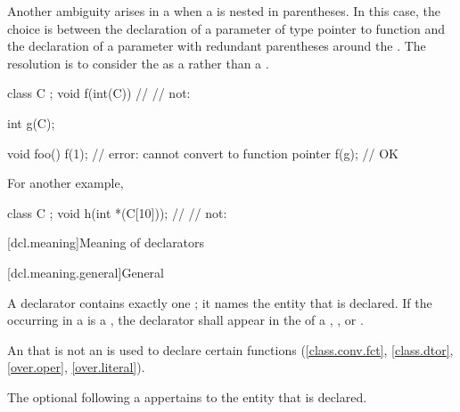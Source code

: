 \pnum
Another ambiguity arises in a
 when a
is nested in parentheses.
In this case, the choice is between the declaration of a parameter of type
pointer to function and the declaration of a parameter with redundant
parentheses around the
.
The resolution is to consider the
as a
rather than a
.
\begin{example}
\begin{codeblock}
class C { };
void f(int(C)) { }              // 
                                // not: 

int g(C);

void foo() {
  f(1);                         // error: cannot convert  to function pointer
  f(g);                         // OK
}
\end{codeblock}

For another example,
\begin{codeblock}
class C { };
void h(int *(C[10]));           // 
                                // not: 
\end{codeblock}
\end{example}

[dcl.meaning]{Meaning of declarators}%

[dcl.meaning.general]{General}%

\pnum
{}%
A declarator contains exactly one ;
it names the entity that is declared.
If the  occurring in a 
is a ,
the declarator shall appear in the  of a
,
, or
.
\begin{note}
An  that is not an 
is used to declare certain functions
(\ref{class.conv.fct}, \ref{class.dtor}, \ref{over.oper}, \ref{over.literal}).
\end{note}
The optional  following a  appertains to the entity that is declared.

